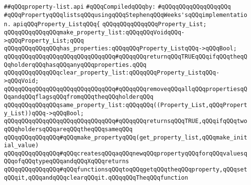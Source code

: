 \label{src/lib/src/property-list.api}
\verb|##qQQqproperty-list.api|\newline
\newline
\verb|#qQQqCompiledqQQqby:|\newline
\verb|#qQQqqQQqqQQqqQQqqQQq|\newline
\newline
\newline
\newline
\verb|#qQQqPropertyqQQqlistsqQQqusingqQQqStephenqQQqWeeks'sqQQqimplementation.|\newline
\newline
\newline
\verb|apiqQQqProperty_ListqQQq{|\newline
\newline
\verb|qQQqqQQqqQQqqQQqProperty_List;|\newline
\newline
\verb|qQQqqQQqqQQqqQQqmake_property_list:qQQqqQQqVoidqQQq->qQQqProperty_List;qQQq|\newline
\newline
\verb|qQQqqQQqqQQqqQQqhas_properties:qQQqqQQqProperty_ListqQQq->qQQqBool;|\newline
\verb|qQQqqQQqqQQqqQQqqQQqqQQqqQQqqQQq#qQQqqQQqreturnqQQqTRUEqQQqifqQQqtheqQQqholderqQQqhasqQQqanyqQQqproperties.qQQq|\newline
\newline
\verb|qQQqqQQqqQQqqQQqclear_property_list:qQQqqQQqProperty_ListqQQq->qQQqVoid;|\newline
\verb|qQQqqQQqqQQqqQQqqQQqqQQqqQQqqQQq#qQQqqQQqremoveqQQqallqQQqpropertiesqQQqandqQQqflagsqQQqfromqQQqtheqQQqholderqQQq|\newline
\newline
\verb|qQQqqQQqqQQqqQQqsame_property_list:qQQqqQQq((Property_List,qQQqProperty_List))qQQq->qQQqBool;|\newline
\verb|qQQqqQQqqQQqqQQqqQQqqQQqqQQqqQQq#qQQqqQQqreturnsqQQqTRUE,qQQqifqQQqtwoqQQqholdersqQQqareqQQqtheqQQqsameqQQq|\newline
\newline
\verb|qQQqqQQqqQQqqQQq#qQQqmake_propertyqQQq(get_property_list,qQQqmake_initial_value)|\newline
\verb|qQQqqQQqqQQqqQQq#qQQqcreatesqQQqaqQQqnewqQQqpropertyqQQqforqQQqvaluesqQQqofqQQqtypeqQQqandqQQqXqQQqreturns|\newline
\verb|qQQqqQQqqQQqqQQq#qQQqfunctionsqQQqtoqQQqgetqQQqtheqQQqproperty,qQQqsetqQQqit,qQQqandqQQqclearqQQqit.qQQqqQQqTheqQQqfunction|\newline
